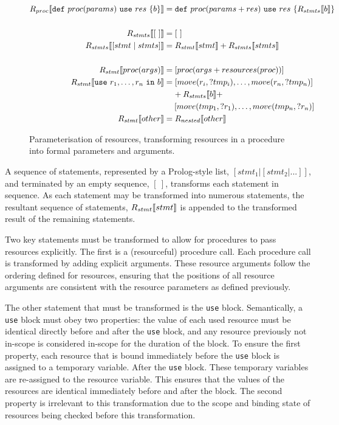 \begin{figure}[ht]
  \centering
  \begin{align*}
    R_{proc}\bbrackets*{\mathtt{def\ } proc(params) \mathtt{\ use\ } res\ \{b\}} &= \mathtt{def\ } proc(params + res)\mathtt{\ use\ } res\ \{ R_{stmts}\bbrackets*{b}\} \\\\
    R_{stmts}\bbrackets*{[\ ]} &= [\ ] \\
    R_{stmts}\bbrackets*{[stmt \mid stmts]} &= R_{stmt}\bbrackets*{stmt} + R_{stmts}\bbrackets*{stmts} \\\\
    R_{stmt}\bbrackets*{proc(args)} &= [proc(args + \mathop{resources}(proc))] \\
    R_{stmt}\bbrackets*{\mathtt{use}\ r_1, \dots, r_n\ \mathtt{in}\ b} &= [move(r_i, ?tmp_i), \dots, move(r_n, ?tmp_n)] \\
     &\phantom{=}\ + R_{stmts}\bbrackets*{b} + \\
     &\phantom{=}\ \, [move(tmp_1, ?r_1), \dots, move(tmp_n, ?r_n)] \\
    R_{stmt}\bbrackets*{other} &= R_{nested}\bbrackets*{other}
  \end{align*}
  \caption{Parameterisation of resources, transforming resources in a procedure into formal parameters and arguments.}
  \label{fig:resource-transformation}
\end{figure}

A sequence of statements, represented by a Prolog-style list, $[stmt_1 | [ stmt_2 | ...]]$, and terminated by an empty sequence, $[\ ]$, transforms each statement in sequence. As each statement may be transformed into numerous statements, the resultant sequence of statements, $R_{stmt}\bbrackets*{stmt}$ is appended to the transformed result of the remaining statements.

Two key statements must be transformed to allow for procedures to pass resources explicitly. The first is a (resourceful) procedure call. Each procedure call is transformed by adding explicit arguments. These resource arguments follow the ordering defined for resources, ensuring that the positions of all resource arguments are consistent with the resource parameters as defined previously.

The other statement that must be transformed is the \texttt{use} block. Semantically, a \texttt{use} block must obey two properties: the value of each used resource must be identical directly before and after the \texttt{use} block, and any resource previously not in-scope is considered in-scope for the duration of the block. To ensure the first property, each resource that is bound immediately before the \texttt{use} block is assigned to a temporary variable. After the \texttt{use} block. These temporary variables are re-assigned to the resource variable. This ensures that the values of the resources are identical immediately before and after the block. The second property is irrelevant to this transformation due to the scope and binding state of resources being checked before this transformation. 

